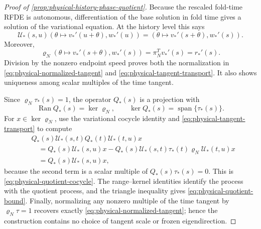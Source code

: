 \begin{proof}[Proof of \cref{prop:physical-history-phase-quotient}]
Because the rescaled fold-time RFDE is autonomous, differentiation of the
base solution in fold time gives a solution of the variational equation.  At the
history level this says
\begin{equation}
 \mathcal U_*(s,u)
 \left(\theta\mapsto v_*'(u+\theta),w_*'(u)\right)
 =\left(\theta\mapsto v_*'(s+\theta),w_*'(s)\right).
                                                               \label{eq:phase-quotient-time-tangent}
\end{equation}
Moreover,
\[
 \varrho_N
 \left(\theta\mapsto v_*'(s+\theta),w_*'(s)\right)
 =\pi_N^Tv_*'(s)=r_*'(s).
\]
Division by the nonzero endpoint speed proves both the normalization in
\cref{eq:physical-normalized-tangent} and
\cref{eq:physical-tangent-transport}.  It also shows uniqueness among scalar
multiples of the time tangent.

Since \(\varrho_N\tau_*(s)=1\), the operator \(Q_*(s)\) is a projection with
\begin{equation}
 \operatorname{Ran}Q_*(s)=\ker\varrho_N,
 \qquad
 \ker Q_*(s)=\operatorname{span}\{\tau_*(s)\}.      \label{eq:phase-quotient-range-kernel}
\end{equation}
For \(x\in\ker\varrho_N\), use the variational cocycle identity and
\cref{eq:physical-tangent-transport} to compute
\begin{align*}
 &Q_*(s)\mathcal U_*(s,t)Q_*(t)\mathcal U_*(t,u)x\\
 &\quad=Q_*(s)\mathcal U_*(s,u)x
 -Q_*(s)\mathcal U_*(s,t)\tau_*(t)
       \varrho_N\mathcal U_*(t,u)x\\
 &\quad=Q_*(s)\mathcal U_*(s,u)x,
\end{align*}
because the second term is a scalar multiple of \(Q_*(s)\tau_*(s)=0\).
This is \cref{eq:physical-quotient-cocycle}.  The range--kernel identities
identify the process with the quotient process, and the triangle inequality
gives \cref{eq:physical-quotient-bound}.  Finally, normalizing any nonzero
multiple of the time tangent by \(\varrho_N\tau=1\) recovers exactly
\cref{eq:physical-normalized-tangent}; hence the construction contains no
choice of tangent scale or frozen eigendirection.
\end{proof}


